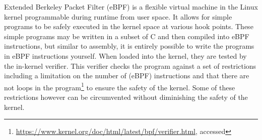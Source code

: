 Extended Berkeley Packet Filter (eBPF) is a flexible virtual machine in the
Linux kernel programmable during runtime from user space. It allows for simple
programs to be safely executed in the kernel space at various hook points. These
simple programs may be written in a subset of C and then compiled into eBPF
instructions, but similar to assembly, it is entirely possible to write the
programs in eBPF instructions yourself. When loaded into the kernel, they are
tested by the in-kernel verifier. This verifier checks the program against a set
of restrictions including a limitation on the number of (eBPF) instructions and
that there are not loops in the
program\footnote{\url{https://www.kernel.org/doc/html/latest/bpf/verifier.html},
accessed } to
ensure the safety of the kernel. Some of these restrictions however can be
circumvented without diminishing the safety of the kernel.



